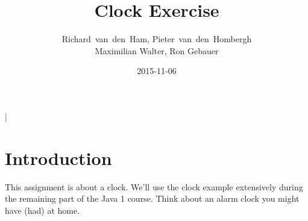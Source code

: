 
\title{Clock Exercise}
\author{Richard~van~den~Ham, Pieter~van~den~Hombergh\\Maximilian Walter, Ron Gebauer}
\def\Sep{\vspace{-\baselineskip}\hrulefill\vspace{-.5\baselineskip}}
\date{2015-11-06}
\lstMakeShortInline|
\lstset{language=Java}

\maketitle
\section*{Introduction}
This assignment is about a clock. We’ll use the clock example
extensively during the remaining part of the Java 1 course. Think about
an alarm clock you might have (had) at home.

